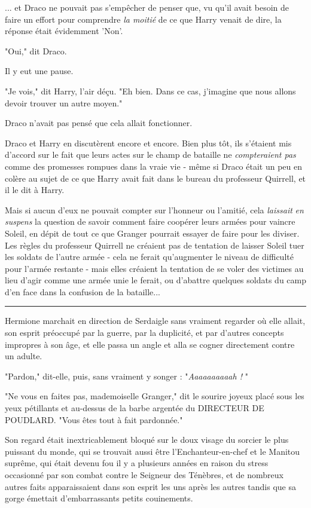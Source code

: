 ... et Draco ne pouvait pas s'empêcher de penser que, vu qu'il avait besoin de faire un effort pour comprendre \emph{la moitié}  de ce que Harry venait de dire, la réponse était évidemment 'Non'.

"Oui," dit Draco.

Il y eut une pause.

"Je vois," dit Harry, l'air déçu. "Eh bien. Dans ce cas, j'imagine que nous allons devoir trouver un autre moyen."

Draco n'avait pas pensé que cela allait fonctionner.

Draco et Harry en discutèrent encore et encore. Bien plus tôt, ils s'étaient mis d'accord sur le fait que leurs actes sur le champ de bataille ne \emph{compteraient pas}  comme des promesses rompues dans la vraie vie - même si Draco était un peu en colère au sujet de ce que Harry avait fait dans le bureau du professeur Quirrell, et il le dit à Harry.

Mais si aucun d'eux ne pouvait compter sur l'honneur ou l'amitié, cela \emph{laissait}  \emph{en suspens}  la question de savoir comment faire coopérer leurs armées pour vaincre Soleil, en dépit de tout ce que Granger pourrait essayer de faire pour les diviser. Les règles du professeur Quirrell ne créaient pas de tentation de laisser Soleil tuer les soldats de l'autre armée - cela ne ferait qu'augmenter le niveau de difficulté pour l'armée restante - mais elles créaient la tentation de se voler des victimes au lieu d'agir comme une armée unie le ferait, ou d'abattre quelques soldats du camp d'en face dans la confusion de la bataille...
\par\noindent\rule{\textwidth}{0.4pt}
Hermione marchait en direction de Serdaigle sans vraiment regarder où elle allait, son esprit préoccupé par la guerre, par la duplicité, et par d'autres concepts impropres à son âge, et elle passa un angle et alla se cogner directement contre un adulte.

"Pardon," dit-elle, puis, sans vraiment y songer : "\emph{Aaaaaaaaaah !} "

"Ne vous en faites pas, mademoiselle Granger," dit le sourire joyeux placé sous les yeux pétillants et au-dessus de la barbe argentée du DIRECTEUR DE POUDLARD. "Vous êtes tout à fait pardonnée."

Son regard était inextricablement bloqué sur le doux visage du sorcier le plus puissant du monde, qui se trouvait aussi être l'Enchanteur-en-chef et le Manitou suprême, qui était devenu fou il y a plusieurs années en raison du stress occasionné par son combat contre le Seigneur des Ténèbres, et de nombreux autres faits apparaissaient dans son esprit les uns après les autres tandis que sa gorge émettait d'embarrassants petits couinements.

